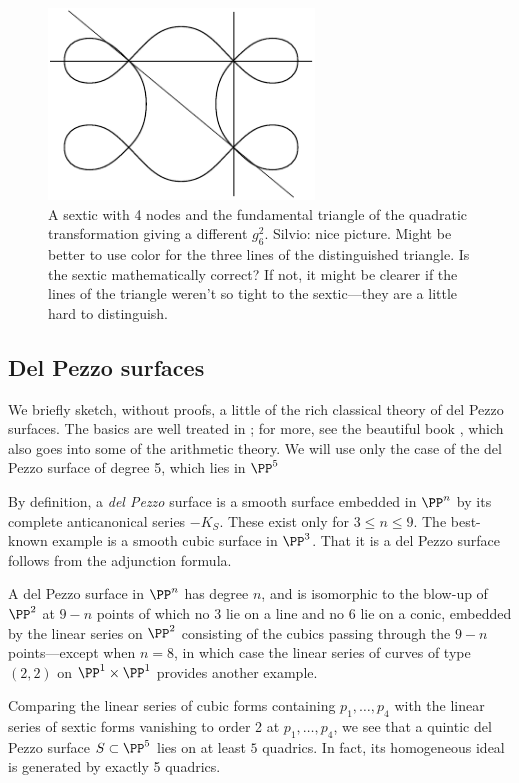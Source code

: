  
\begin{figure}
\centerline {\includegraphics[height=2in]{"main/Fig11-4"}}
\caption{A sextic with 4 nodes and the fundamental triangle of the quadratic transformation giving
a different $g^{2}_{6}$. {Silvio: nice picture. Might be better to use color for the three lines of the distinguished triangle. Is the sextic mathematically correct? If not, it might be clearer if the lines of the triangle weren't so tight to the sextic---they are a little hard to distinguish.}}
\label{default}
\end{figure}


\subsection{Del Pezzo surfaces}

We briefly sketch, without proofs, a little of the 
 rich classical theory of del Pezzo surfaces. The basics are well treated in \cite[pp. 45--50]{Beauville}; for more, see the
beautiful book \cite{Manin}, which also goes into some of the arithmetic theory. We will use only the case of the del Pezzo surface of degree 5, which lies in $\PP^{5}$

By definition,
a \emph{del Pezzo} surface is a smooth surface embedded in $\PP^n$  by its complete anticanonical series $-K_S$. These exist only for $3\leq n\leq 9$. The best-known example is a smooth cubic surface in $\PP^3$. That it is a del Pezzo surface follows from the adjunction formula.

A del Pezzo surface in $\PP^n$ has degree $n$, and is isomorphic to the blow-up of $\PP^2$ at $9-n$ points of which no 3 lie on a line and no 6 lie on a conic, embedded by the linear series on $\PP^2$
consisting of the cubics passing through the $9-n$ points---except when $n=8$, in which case the
linear series of curves of type $(2,2)$ on $\PP^1\times \PP^1$ provides another example.

Comparing the linear series  of cubic forms containing $p_1,\dots,p_4$ with the linear series  of sextic forms vanishing to order 2 at $p_1,\dots,p_4$, we see that a quintic del Pezzo surface $S \subset \PP^5$ lies on at least $5$ quadrics. In fact, its homogeneous ideal is generated by exactly 5 quadrics.


